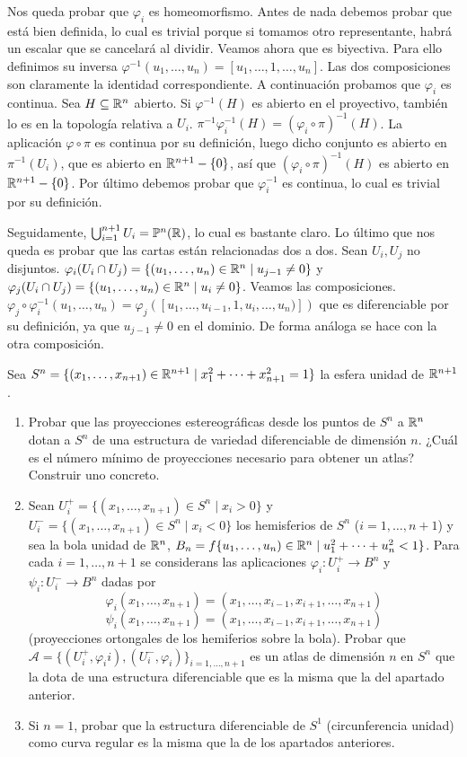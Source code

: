 \documentclass[twoside]{article}
\begin{document}
\begin{solucion}
Nos queda probar que $\varphi_i$ es homeomorfismo. Antes de nada debemos probar que está bien definida, lo cual es trivial porque si tomamos otro representante, habrá un escalar que se cancelará al dividir. Veamos ahora que es biyectiva. Para ello definimos su inversa $\varphi^{-1}(u_1,\dots,u_n)=[u_1,\dots,1,\dots,u_n]$. Las dos composiciones son claramente la identidad correspondiente. A continuación probamos que $\varphi_i$ es continua. Sea $H\subseteq\mathbb{R}^n$ abierto. Si $\varphi^{-1}(H)$ es abierto en el proyectivo, también lo es en la topología relativa a $U_i$. $\pi^{-1}\varphi_i^{-1}(H)=(\varphi_i\circ\pi)^{-1}(H)$. La aplicación $\varphi\circ\pi$ es continua por su definición, luego dicho conjunto es abierto en $\pi^{-1}(U_i)$, que es abierto en $\mathbb{R}^{n+1}-\{0\}$, así que $(\varphi_i\circ\pi)^{-1}(H)$ es abierto en $\mathbb{R}^{n+1}-\{0\}$. Por último debemos probar que $\varphi_i^{-1}$ es continua, lo cual es trivial por su definición.

Seguidamente, $\bigcup_{i=1}^{n+1} U_i=\mathbb{P}^n(\mathbb{R})$, lo cual es bastante claro. Lo último que nos queda es probar que las cartas están relacionadas dos a dos. Sean $U_i,U_j$ no disjuntos. $\varphi_i(U_i\cap U_j)=\{(u_1,\dots,u_n)\in\mathbb{R}^n\mid u_{j-1}\neq 0\}$ y $\varphi_j(U_i\cap U_j)=\{(u_1,\dots,u_n)\in\mathbb{R}^n\mid u_{i}\neq 0\}$. Veamos las composiciones. $\varphi_j\circ\varphi^{-1}_i(u_1,\dots,u_n)=\varphi_j([u_1,\dots,u_{i-1},1,u_i,\dots,u_n)])$ que es diferenciable por su definición, ya que $u_{j-1}\neq 0$ en el dominio. De forma análoga se hace con la otra composición.
\end{solucion}
\newpage
\begin{ejercicio}{2}
Sea $S^n = \{(x_1,\dots, x_{n+1})\in \mathbb{R}^{n+1}\mid x^2_1
+\cdots+x^2_{n+1} = 1\}$ la esfera
unidad de $\mathbb{R}^{n+1}$.\
\begin{enumerate}
\item Probar que las proyecciones estereográficas desde los puntos de $S^n$ a $\mathbb{R}^n$
dotan a $S^n$ de una estructura de variedad diferenciable de dimensión $n$.
¿Cuál es el número mínimo de proyecciones necesario para obtener un atlas?
Construir uno concreto.
\item Sean $U^+_i = \{(x_1, \dots, x_{n+1}) \in S^n\mid x_i > 0\}$ y $U^-_i = \{(x_1, \dots, x_{n+1}) \in S^n\mid x_i <
0\}$ los hemisferios de $S^n$ ($i = 1,\dots, n + 1$) y sea la bola unidad de $\mathbb{R}^n$,
$B_n = f\{u_1,\dots, u_n) \in \mathbb{R}^n\mid u^2_1
+ \cdots + u^2_n < 1\}$. Para cada $i = 1, \dots, n + 1$ se considerans las aplicaciones $φ_i : U_i^+ \to B^n$ y $ψ_i : U_i^- \to B^n$ dadas por
\[ φ_i(x_1,\dots,x_{n+1}) = (x_1,\dots,x_{i-1},x_{i+1},\dots,x_{n+1}) \]
\[ ψ_i(x_1,\dots,x_{n+1}) = (x_1,\dots,x_{i-1},x_{i+1},\dots,x_{n+1}) \]
(proyecciones ortongales de los hemiferios sobre la bola). Probar que $\mathcal{A} = \{(U_i^+,φ_ii),(U_i^-,φ_i)\}_{i=1,\dots,n+1}$ es un atlas de dimensión $n$ en $S^n$ que la dota de una estructura diferenciable que es la misma que la del apartado anterior.
\item Si $n=1$, probar que la estructura diferenciable de $S^1$ (circunferencia unidad) como curva regular es la misma que la de los apartados anteriores.
\end{enumerate}
\end{ejercicio}
\end{document}

